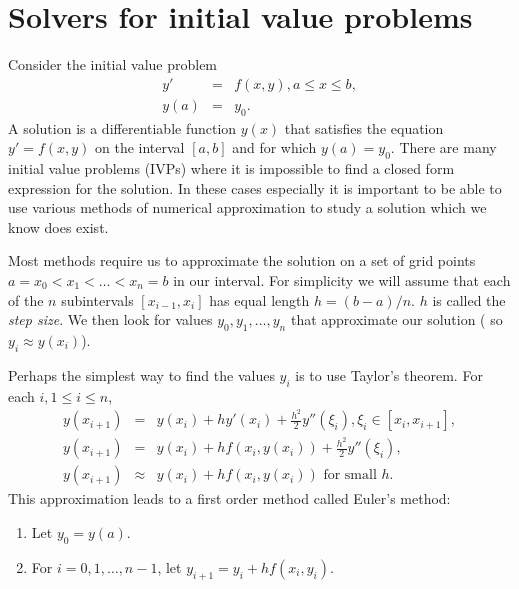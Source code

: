 \label{lab:IVP}


\section{Solvers for initial value problems}

Consider the initial value problem 
\begin{eqnarray*}
y' &=& f(x,y), a \leq x \leq b, \\
y(a) &=& y_0.
\end{eqnarray*}
A solution is a differentiable function $y(x)$ that satisfies the equation $y' = f(x,y)$ on the interval $[a,b]$ and for which $y(a) = y_0$.  There are many initial value problems (IVPs) where it is impossible to find a closed form expression for the solution. In these cases especially it is important to be able to use various methods of numerical approximation to study a solution which we know does exist. 

Most methods require us to approximate the solution on a set of grid points $a = x_0< x_1<\hdots< x_n = b$ in our interval.  For simplicity we will assume that each of the $n$ subintervals $[x_{i-1},x_i]$ has equal length $h = (b-a)/n$. $h$ is called the \textit{step size}. We then look for values $y_0,y_1, \hdots, y_n$ that approximate our solution ( so $y_i \approx y(x_i)$).  

Perhaps the simplest way to find the values $y_i$ is to use Taylor's theorem. For each $i, 1 \leq i \leq n$, 
\begin{eqnarray*}
y(x_{i+1}) &=& y(x_{i}) + h y'(x_i) + \frac{h^2}{2} y''(\xi_i), \xi_i \in [x_i,x_{i+1}], \\
y(x_{i+1}) &=& y(x_{i}) + h f(x_i,y(x_i)) + \frac{h^2}{2} y''(\xi_i),\\
y(x_{i+1}) &\approx & y(x_{i}) + h f(x_i,y(x_i)) \text{ for small } h .
\end{eqnarray*}
This approximation leads to a first order method called Euler's method: 
\begin{enumerate}
\item Let $y_0 = y(a)$. 
\item For $i = 0, 1, \hdots, n-1$, let $y_{i+1} = y_i +hf(x_i,y_i)$. 
\end{enumerate}

